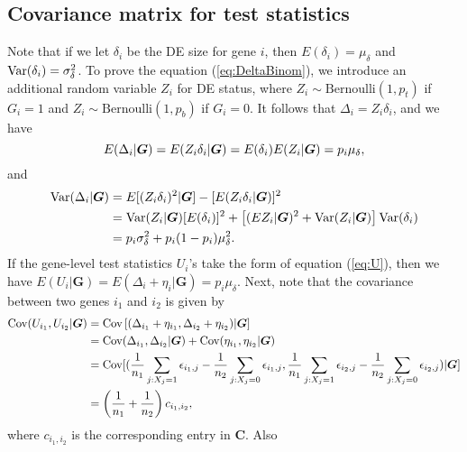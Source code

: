 \begin{appendices}
	\subsection{Covariance matrix for test statistics}\label{app:covariance}
	Note that if we let $\delta_i$ be the DE size for gene $i$, then $E(\delta_i)= \mu_{\delta}$ 
	and $\text{Var}(\delta_i) = \sigma_{\delta}^2$. To prove the equation (\ref{eq:DeltaBinom}), we 
	introduce an additional random variable $Z_i$ for DE status, where 
	$Z_i\sim \text{Bernoulli}(1, p_t)$ if $G_i = 1$ and $Z_i\sim \text{Bernoulli}(1, p_b)$ if $G_i 
	= 0$. It follows that $\Delta_i =Z_i\delta_i$, and we have 
	\begin{equation}\notag
	E(\Delta_i|\bm G) = E(Z_i\delta_i|\bm G) = E(\delta_i)E(Z_i|\bm G)=  p_i\mu_{\delta},
	\end{equation}
	and 
	\begin{equation}\notag
	\begin{aligned}
	\text{Var}(\Delta_i|\bm G) & = E[(Z_i\delta_i)^2|\bm G]- [E(Z_i\delta_i|\bm G)]^2 \\
	& = \text{Var}(Z_i|\bm G)[E(\delta_i)]^2 + \left[(EZ_i|\bm G)^2 + 
	\text{Var}(Z_i|\bm G)\right]\text{Var}(\delta_i) \\
	& =p_i\sigma_{\delta}^2 + p_i(1-p_i)\mu_{\delta}^2.
	\end{aligned}
	\end{equation}
	If the gene-level test statistics $U_i$'s take the form of equation (\ref{eq:U}), then we have 
	$E(U_i|\bm G) = E(\Delta_i + \eta_i|\bm G)  = p_i\mu_{\delta}$. Next, note that the covariance 
	between two genes $i_1$ and $i_2$ is given by 
	\begin{equation}\label{eq:app1}
	\begin{aligned}
	\text{Cov}(U_{i_1}, U_{i_2}|\bm G) & =\text{Cov}\left[(\Delta_{i_1} + \eta_{i_1}, \Delta_{i_2} + 
	\eta_{i_2})|\bm G\right] \\
	& = \text{Cov}(\Delta_{i_1}, \Delta_{i_2}|\bm G) + \text{Cov}(\eta_{i_1}, \eta_{i_2}|\bm G)\\
	& = \text{Cov}[(\dfrac{1}{n_1}\sum_{j: X_j=1}\epsilon_{i_1,j}-
	\dfrac{1}{n_2}\sum_{j: X_j=0}\epsilon_{i_1,j}, \dfrac{1}{n_1}\sum_{j: X_j=1}\epsilon_{i_2,j}-
	\dfrac{1}{n_2}\sum_{j: X_j=0}\epsilon_{i_2,j})|\bm G]\\
	& = \left(\frac{1}{n_1} + \frac{1}{n_2}\right)c_{i_1,i_2},
	\end{aligned}
	\end{equation}
	where $c_{i_1,i_2}$ is the corresponding entry in $\bm C$. Also 
	\begin{equation}\label{eq:app2}

\end{equation}
\end{appendices}
